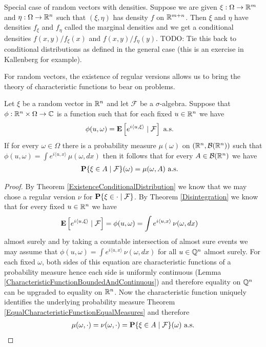 Special case of random vectors with densities.  Suppose we are given
$\xi : \Omega \to \reals^m$ and $\eta: \Omega \to \reals^n$ such that
$(\xi,\eta)$ has density $f$ on $\reals^{m+n}$.  Then $\xi$ and $\eta$ have
densities $f_{\xi}$ and $f_\eta$ called the marginal densities and we
get a conditional densities $f(x,y)/f_\xi(x)$ and $f(x,y)/f_\eta(y)$.
TODO: Tie this back to conditional distributions as defined in the
general case (this is an exercise in Kallenberg for example).

For random vectors, the existence of regular versions allows us to
bring the theory of characteristic functions to bear on problems.

\begin{lem}\label{ConditionalCharacteristicFunctions}Let $\xi$ be a random vector in $\reals^n$ and let
  $\mathcal{F}$ be a $\sigma$-algebra.  Suppose that $\phi : \reals^n
  \times \Omega \to \complexes$ is a function such that for each fixed
  $u \in \reals^n$ we have
\begin{align*}
\phi(u, \omega) &= \cexpectationlong{\mathcal{F}}{e^{i\langle u,\xi
    \rangle}} \text{ a.s.}
\end{align*}
If for every $\omega \in \Omega$ there is a probability measure
$\mu(\omega)$ on $(\reals^n, \mathcal{B}(\reals^n))$ such that
$\phi(u, \omega) = \int e^{i\langle u, x \rangle} \, \mu(\omega, dx)$
then it follows that for every $A \in \mathcal{B}(\reals^n)$ we have
\begin{align*}
\cprobability{\mathcal{F}}{\xi \in A}(\omega) &= \mu(\omega, A) \text{ a.s.}
\end{align*}
\end{lem}
\begin{proof}
By Theorem \ref{ExistenceConditionalDistribution} we know that we may
chose a regular version $\nu$ for $\cprobability{\mathcal{F}}{\xi \in
  \cdot}$.  By Theorem \ref{Disintegration} we know that for every
fixed $u \in \reals^n$ we have
\begin{align*}
\cexpectationlong{\mathcal{F}}{e^{i \langle u, \xi \rangle}} &=
\phi(u, \omega) = \int
e^{i \langle u, x \rangle} \, \nu(\omega, dx)
\end{align*} 
almost surely and by
taking a countable intersection of almost sure events we may assume
that $\phi(u, \omega) = \int
e^{i \langle u, x \rangle} \, \nu(\omega, dx)$ for all $u \in
\rationals^n$ almost surely.  For each fixed $\omega$, both sides of
this equation are characteristic functions of a probability measure
hence each side is uniformly continuous (Lemma
\ref{CharacteristicFunctionBoundedAndContinuous}) and therefore
equality on $\rationals^n$ can be upgraded to equality on $\reals^n$.
Now the characteristic function uniquely identifies the underlying
probability measure Theorem
\ref{EqualCharacteristicFunctionEqualMeasures} and therefore 
\begin{align*}
\mu(\omega, \cdot) = \nu(\omega, \cdot) =
\cprobability{\mathcal{F}}{\xi \in A}(\omega) \text{ a.s.}
\end{align*}
\end{proof}

